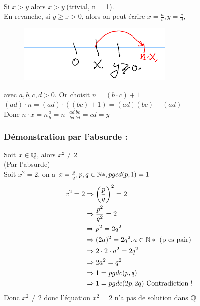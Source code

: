 \documentclass[12pt,a4paper]{article}
\begin{document}
 \\
Si $x > y$ alors $x > y$ (trivial, n = 1).\\
En revanche, si $y \geq x > 0$, alors on peut écrire $x= \frac{a}{b}, y = \frac{c}{d}$, 
\begin{figure}
\includegraphics[scale=1]{Illustrations_Analyse/archimedien.png}
\end{figure}
avec $a,b,c,d > 0$. On choisit $n = (b\cdot c) + 1$\\
$(ad)\cdot n = (ad)\cdot((bc)+1) = (ad)(bc)+(ad)$\\
Donc $n\cdot x = n \frac{a}{b} = n\cdot \frac{ad}{bd} \frac{bc}{bd} = cd = y$

\subsubsection{Démonstration par l'absurde :}
 Soit $x \in \mathbb{Q}$, alors $x^2 \neq 2$\\
(Par l'absurde)\\
Soit $x^2 = 2$, on a $x = \frac{p}{q}, p,q \in \mathbb{N}*, pgcd(p,1) = 1$\\
\begin{align*}
	x^2 = 2 & \Rightarrow \left(\frac{p}{q}\right)^2 = 2\\
			& \Rightarrow  \frac{p^2}{q^2} = 2\\
			& \Rightarrow p^2 = 2q^2\\
			& \Rightarrow (2a)^2 = 2q^2, a \in \mathbb{N}*\mbox{ (p es pair)}\\
			& \Rightarrow 2\cdot 2 \cdot a^2 = 2q^2\\
			& \Rightarrow 2a^2 = q^2\\
			& \Rightarrow 1 = pgdc(p,q)\\
			& \Rightarrow 1 = pgdc(2p,2q) \mbox{ Contradiction !}
\end{align*}
Donc $x^2 \neq 2$ donc l'équation $x^2 = 2$ n'a pas de solution dans $\mathbb{Q}$
\end{document}

